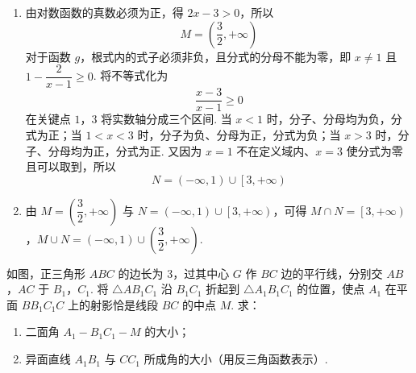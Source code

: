 \begin{solution}
\begin{enumerate}
\item 由对数函数的真数必须为正，得 \(2x-3>0\)，所以
\[
M=\left(\dfrac32,+\infty\right)
\]
对于函数 \(g\)，根式内的式子必须非负，且分式的分母不能为零，即 \(x\ne1\) 且 \(1-\dfrac{2}{x-1}\geqslant0\). 将不等式化为
\[
\dfrac{x-3}{x-1}\geqslant0
\]
在关键点 \(1\)，\(3\) 将实数轴分成三个区间. 当 \(x<1\) 时，分子、分母均为负，分式为正；当 \(1<x<3\) 时，分子为负、分母为正，分式为负；当 \(x>3\) 时，分子、分母均为正，分式为正. 又因为 \(x=1\) 不在定义域内、\(x=3\) 使分式为零且可以取到，所以
\[
N=\left(-\infty,1\right)\cup\left[3,+\infty\right)
\]

\item 由 \(M=\left(\dfrac32,+\infty\right)\) 与 \(N=\left(-\infty,1\right)\cup\left[3,+\infty\right)\)，可得 \(M\cap N=\left[3,+\infty\right)\)，\(M\cup N=\left(-\infty,1\right)\cup\left(\dfrac32,+\infty\right)\).
\end{enumerate}
\end{solution}

\begin{problem}
如图，正三角形 \(ABC\) 的边长为 \(3\)，过其中心 \(G\) 作 \(BC\) 边的平行线，分别交 \(AB\)，\(AC\) 于 \(B_1\)，\(C_1\). 将 \(\triangle AB_1C_1\) 沿 \(B_1C_1\) 折起到 \(\triangle A_1B_1C_1\) 的位置，使点 \(A_1\) 在平面 \(BB_1C_1C\) 上的射影恰是线段 \(BC\) 的中点 \(M\). 求：

\begin{enumerate}
\item 二面角 \(A_1-B_1C_1-M\) 的大小；
\item 异面直线 \(A_1B_1\) 与 \(CC_1\) 所成角的大小（用反三角函数表示）.
\end{enumerate}

\end{problem}

